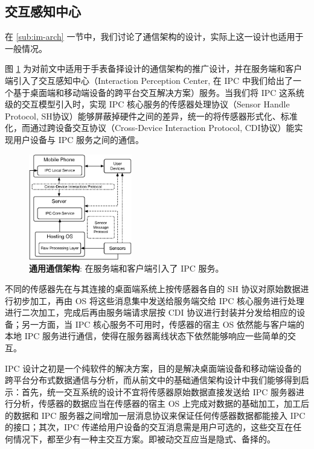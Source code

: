 \subsection{交互感知中心}

在 \ref{sub:im-arch} 一节中，我们讨论了通信架构的设计，实际上这一设计也适用于一般情况。

图 \ref{fig:universe-arch} 为对前文中适用于手表备择设计的通信架构的推广设计，并在服务端和客户端引入了交互感知中心（Interaction Perception Center, 在 IPC 中我们给出了一个基于桌面端和移动端设备的跨平台交互解决方案）服务\cite{Changkun:2015ipc}。当我们将 IPC 这系统级的交互模型引入时，实现 IPC 核心服务的传感器处理协议（Sensor Handle Protocol, SH协议）能够屏蔽掉硬件之间的差异，统一的将传感器形式化、标准化，而通过跨设备交互协议（Cross-Device Interaction Protocol, CDI协议）能实现用户设备与 IPC 服务之间的通信。

\begin{figure}[H]
    \kaishu
    \centering
    \includegraphics[width=0.4\textwidth]{figures/universe-arch}
    \caption{\kaishu \textbf{通用通信架构}: 在服务端和客户端引入了 IPC 服务。}
    \label{fig:universe-arch}
\end{figure}

不同的传感器先在与其连接的桌面端系统上按传感器各自的 SH 协议对原始数据进行初步加工，再由 OS 将这些消息集中发送给服务端交给 IPC 核心服务进行处理进行二次加工，完成后再由服务端请求层按 CDI 协议进行封装并分发给相应的设备；另一方面，当 IPC 核心服务不可用时，传感器的宿主 OS 依然能与客户端的本地 IPC 服务进行通信，使得在服务器离线状态下依然能够响应一些简单的交互。

IPC 设计之初是一个纯软件的解决方案，目的是解决桌面端设备和移动端设备的跨平台分布式数据通信与分析，而从前文中的基础通信架构设计中我们能够得到启示：首先，统一交互系统的设计不宜将传感器原始数据直接发送给 IPC 服务器进行分析，传感器的数据应当在传感器的宿主 OS 上完成对数据的基础加工，加工后的数据和 IPC 服务器之间增加一层消息协议来保证任何传感器数据都能接入 IPC 的接口；其次，IPC 传递给用户设备的交互消息需是用户可选的，这些交互在任何情况下，都至少有一种主交互方案。即被动交互应当是隐式、备择的。

